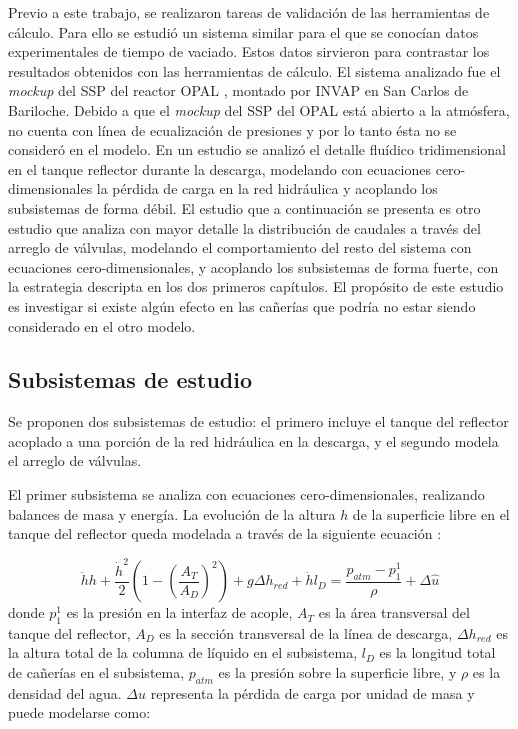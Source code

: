 Previo a este trabajo, se realizaron tareas de validación de las herramientas de cálculo.
Para ello se estudió un sistema similar para el que se conocían datos experimentales de tiempo de vaciado.
Estos datos sirvieron para contrastar los resultados obtenidos con las herramientas de cálculo.
El sistema analizado fue el \textit{mockup} del SSP del reactor OPAL \cite{invap-mockup},
montado por INVAP en San Carlos de Bariloche.
Debido a que el \textit{mockup} del SSP del OPAL está abierto a la atmósfera,
no cuenta con línea de ecualización de presiones y por lo tanto ésta no se consideró en el modelo.
En un estudio \cite{cnea-informe-mockup} se analizó el detalle fluídico tridimensional en el tanque reflector durante la descarga,
modelando con ecuaciones cero-dimensionales la pérdida de carga en la red hidráulica 
y acoplando los subsistemas de forma débil.
El estudio que a continuación se presenta es otro estudio que analiza con mayor detalle la distribución de caudales a través del arreglo de válvulas,
modelando el comportamiento del resto del sistema con ecuaciones cero-dimensionales,
y acoplando los subsistemas de forma fuerte, con la estrategia descripta en los dos primeros capítulos.
El propósito de este estudio es investigar si existe algún efecto en las cañerías que podría no estar siendo considerado en el otro modelo.

\subsection*{Subsistemas de estudio}

Se proponen dos subsistemas de estudio:
el primero incluye el tanque del reflector acoplado a una porción de la red hidráulica en la descarga,
y el segundo modela el arreglo de válvulas.

El primer subsistema se analiza con ecuaciones cero-dimensionales,
realizando balances de masa y energía.
La evolución de la altura $h$ de la superficie libre en el tanque del reflector
queda modelada a través de la siguiente ecuación \cite{bird}:

\begin{equation}
\ddot{h} h + \frac{\dot{h}^2}{2}\left( 1- \left(\frac{A_T}{A_D} \right)^2 \right) + g \Delta h_{red} + \ddot{h}  l_D = 
\frac{p_{atm}-p_1^1}{\rho} + \Delta \hat{u}
\label{eq-tanque}
\end{equation}
donde $p_1^1$ es la presión en la interfaz de acople,
$A_T$ es la área transversal del tanque del reflector, 
$A_D$ es la sección transversal de la línea de descarga,
$\Delta h_{red}$ es la altura total de la columna de líquido en el subsistema,
$l_D$ es la longitud total de cañerías en el subsistema,
$p_{atm}$ es la presión sobre la superficie libre,
y $\rho$ es la densidad del agua.
$\Delta u$ representa la pérdida de carga por unidad de masa y puede modelarse como:

